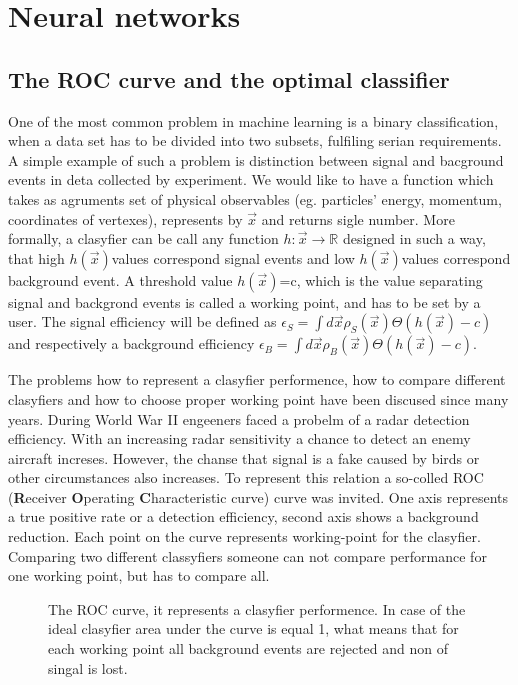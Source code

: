 \newcommand{\h}{$h(\vec x)$}
\newcommand{\e}{\epsilon}
\chapter{Neural networks}\label{chapter:NN}



\section{The ROC curve and the optimal classifier}
One of the most common problem in machine learning is a binary classification, when a data set has to be divided into two subsets, fulfiling serian requirements. A simple example of such a problem is distinction between signal and bacground events in deta collected by experiment. We would like to have a function which takes as agruments set of physical observables (eg. particles' energy, momentum, coordinates of vertexes), represents by $\vec{x}$ and returns sigle number. More formally, a clasyfier can be call any function $h: \vec x \rightarrow \mathbb{R}$ designed in such a way, that high \h values correspond signal events and low \h values correspond background event. A threshold value  \h =c, which is the value separating signal and backgrond events is called a working point, and has to be set by a user. The signal efficiency will be defined as $\e_S=\int d\vec x \rho_S(\vec x) \Theta(h(\vec x) -c)$ and respectively a background efficiency $\e_B=\int d\vec x \rho_B(\vec x) \Theta(h(\vec x) -c)$.

The problems how to represent a clasyfier performence, how to compare different clasyfiers and how to choose proper working point have been discused since many years. During World War II engeeners faced a probelm of a radar detection efficiency. With an increasing radar sensitivity a chance to detect an enemy aircraft increses. However, the chanse that signal is a fake caused by birds or other circumstances also increases. To represent this relation a so-colled ROC (\textbf{R}eceiver \textbf{O}perating \textbf{C}haracteristic curve) curve was invited. One axis represents a true positive rate  or a detection efficiency, second axis shows a background reduction. Each point on the curve represents working-point for the clasyfier. Comparing two different classyfiers someone can not compare performance for one working point, but has to compare all.

\begin{figure}[hb]
  \centering
  \caption{The ROC curve, it represents a clasyfier performence. In case of the ideal clasyfier area under the curve is equal 1, what means that for each working point all background events are rejected and non of singal is lost. }
  \label{fig:ROC}
\end{figure}


